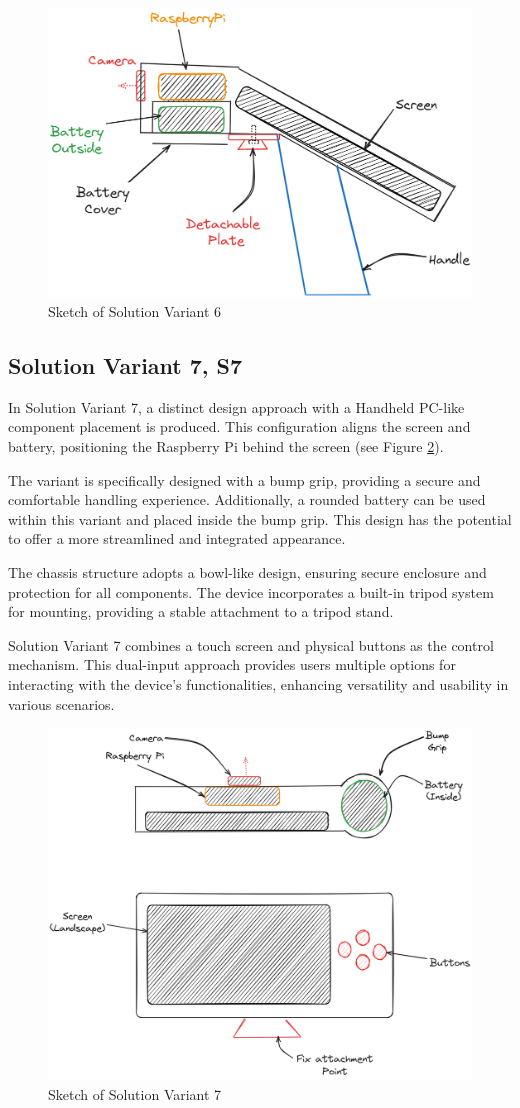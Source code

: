\begin{figure}[H]
    \centering
    \includegraphics[width=0.5\linewidth]{texs/Part1/chapter3/image/v6.png}
    \caption{Sketch of Solution Variant 6}
    \label{fig:sketch-solution-variant-6}
\end{figure}

\subsection{Solution Variant 7, S7}
In Solution Variant 7, a distinct design approach with a Handheld PC-like component placement is produced. This configuration aligns the screen and battery, positioning the Raspberry Pi behind the screen (see Figure \ref{fig:sketch-solution-variant-7}).

The variant is specifically designed with a bump grip, providing a secure and comfortable handling experience. Additionally, a rounded battery can be used within this variant and placed inside the bump grip. This design has the potential to offer a more streamlined and integrated appearance.

The chassis structure adopts a bowl-like design, ensuring secure enclosure and protection for all components. The device incorporates a built-in tripod system for mounting, providing a stable attachment to a tripod stand.

Solution Variant 7 combines a touch screen and physical buttons as the control mechanism. This dual-input approach provides users multiple options for interacting with the device's functionalities, enhancing versatility and usability in various scenarios.

\begin{figure}[H]
    \centering
    \includegraphics[width=0.5\linewidth]{texs/Part1/chapter3/image/v7.png}
    \caption{Sketch of Solution Variant 7}
    \label{fig:sketch-solution-variant-7}
\end{figure}

